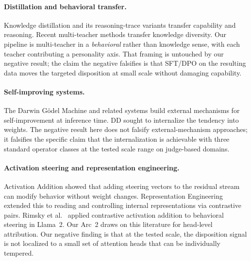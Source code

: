 \documentclass[11pt,a4paper]{article}
\begin{document}
\paragraph{Distillation and behavioral transfer.} Knowledge distillation \cite{hinton2015distilling} and its reasoning-trace variants \cite{hsieh2023distilling} transfer capability and reasoning. Recent multi-teacher methods transfer knowledge diversity. Our pipeline is multi-teacher in a \emph{behavioral} rather than knowledge sense, with each teacher contributing a personality axis. That framing is untouched by our negative result; the claim the negative falsifies is that SFT/DPO on the resulting data moves the targeted disposition at small scale without damaging capability.

\paragraph{Self-improving systems.} The Darwin G\"odel Machine \cite{zhang2025dgm} and related systems build external mechanisms for self-improvement at inference time. DD sought to internalize the tendency into weights. The negative result here does not falsify external-mechanism approaches; it falsifies the specific claim that the internalization is achievable with three standard operator classes at the tested scale range on judge-based domains.

\begin{sloppypar}
\paragraph{Activation steering and representation engineering.} Activation Addition \cite{turner2023steering} showed that adding steering vectors to the residual stream can modify behavior without weight changes. Representation Engineering \cite{zou2023representation} extended this to reading and controlling internal representations via contrastive pairs. Rimsky et al.\ \cite{rimsky2023contrastive} applied contrastive activation addition to behavioral steering in Llama~2. Our Arc~2 draws on this literature for head-level attribution. Our negative finding is that at the tested scale, the disposition signal is not localized to a small set of attention heads that can be individually tempered.
\end{sloppypar}
\end{document}
